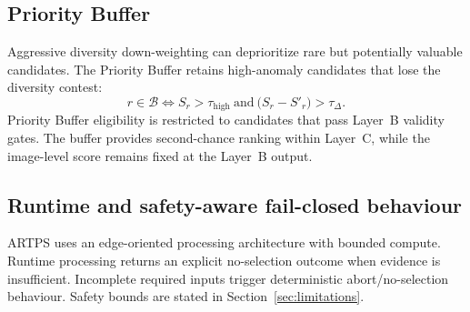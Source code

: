 \subsection{Priority Buffer}
Aggressive diversity down-weighting can deprioritize rare but potentially valuable candidates.
The Priority Buffer retains high-anomaly candidates that lose the diversity contest:
\[
r\in\mathcal{B}\iff S_r>\tau_{\mathrm{high}}\ \mathrm{and}\ \bigl(S_r-S'_r\bigr)>\tau_\Delta.
\]
Priority Buffer eligibility is restricted to candidates that pass Layer~B validity gates.
The buffer provides second-chance ranking within Layer~C, while the image-level score remains
fixed at the Layer~B output.

\subsection{Runtime and safety-aware fail-closed behaviour}
ARTPS uses an edge-oriented processing architecture with bounded compute.
Runtime processing returns an explicit no-selection outcome when evidence is insufficient.
Incomplete required inputs trigger deterministic abort/no-selection behaviour.
Safety bounds are stated in Section~\ref{sec:limitations}.
